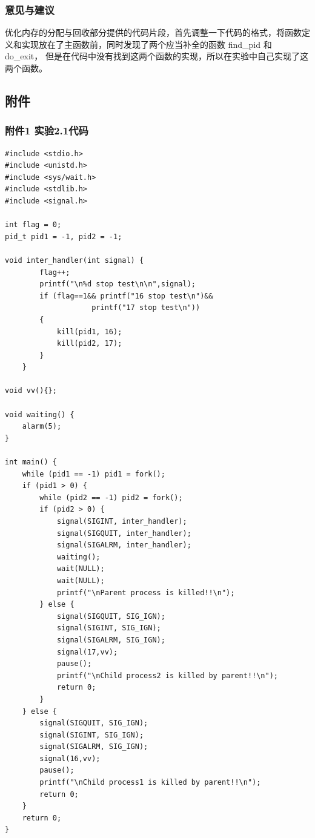 \documentclass{article}
\begin{document}
    \subsubsection{意见与建议}

    优化内存的分配与回收部分提供的代码片段，首先调整一下代码的格式，将函数定义和实现放在了主函数前，同时发现了两个应当补全的函数 find\_pid 和 do\_exit，
    但是在代码中没有找到这两个函数的实现，所以在实验中自己实现了这两个函数。

    \subsection{附件}

    \subsubsection{附件1 实验2.1代码}

    \lstset{language=C}

    \begin{lstlisting}
#include <stdio.h>
#include <unistd.h>
#include <sys/wait.h>
#include <stdlib.h>
#include <signal.h>

int flag = 0;
pid_t pid1 = -1, pid2 = -1;

void inter_handler(int signal) {
        flag++;
        printf("\n%d stop test\n\n",signal);
        if (flag==1&& printf("16 stop test\n")&& 
                    printf("17 stop test\n"))
        {
            kill(pid1, 16);
            kill(pid2, 17);
        }
    }

void vv(){};

void waiting() {
    alarm(5);
}

int main() {
    while (pid1 == -1) pid1 = fork();
    if (pid1 > 0) {
        while (pid2 == -1) pid2 = fork();
        if (pid2 > 0) {
            signal(SIGINT, inter_handler);
            signal(SIGQUIT, inter_handler);
            signal(SIGALRM, inter_handler);
            waiting();
            wait(NULL);
            wait(NULL);
            printf("\nParent process is killed!!\n");
        } else {
            signal(SIGQUIT, SIG_IGN);
            signal(SIGINT, SIG_IGN);
            signal(SIGALRM, SIG_IGN);
            signal(17,vv);
            pause();
            printf("\nChild process2 is killed by parent!!\n");
            return 0;
        }
    } else {
        signal(SIGQUIT, SIG_IGN);
        signal(SIGINT, SIG_IGN);
        signal(SIGALRM, SIG_IGN);
        signal(16,vv);
        pause();
        printf("\nChild process1 is killed by parent!!\n");
        return 0;
    }
    return 0;
}
    \end{lstlisting}
\end{document}
